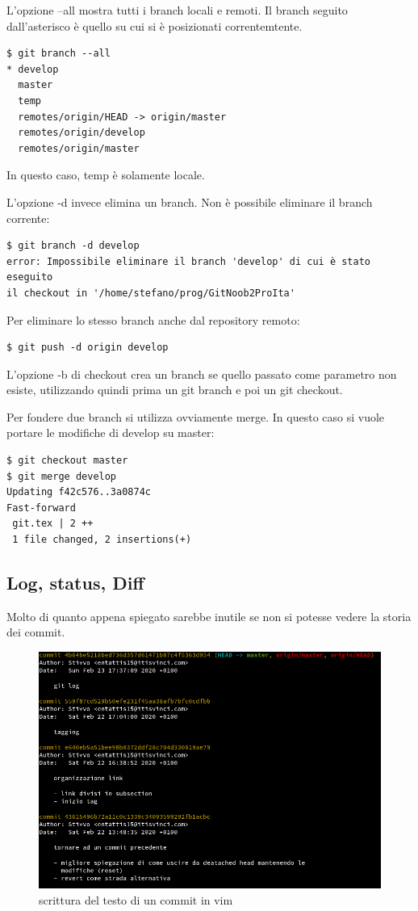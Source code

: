 \documentclass{article} \usepackage[textwidth=18cm,textheight=18cm]{geometry}
\begin{document}
L'opzione --all mostra tutti i branch locali e remoti. Il branch seguito
dall'asterisco è quello su cui si è posizionati correntemtente.

\begin{verbatim}
$ git branch --all
* develop
  master
  temp
  remotes/origin/HEAD -> origin/master
  remotes/origin/develop
  remotes/origin/master
\end{verbatim}

In questo caso, temp è solamente locale.

L'opzione -d invece elimina un branch. Non è possibile eliminare il branch corrente:

\begin{verbatim}
$ git branch -d develop
error: Impossibile eliminare il branch 'develop' di cui è stato eseguito 
il checkout in '/home/stefano/prog/GitNoob2ProIta'
\end{verbatim}

Per eliminare lo stesso branch anche dal repository remoto:

\begin{verbatim}
$ git push -d origin develop
\end{verbatim}

L'opzione -b di checkout crea un branch se quello passato come parametro non
esiste, utilizzando quindi prima un git branch e poi un git checkout.

Per fondere due branch si utilizza ovviamente merge. In questo caso si vuole
portare le modifiche di develop su master:

\begin{verbatim}
$ git checkout master
$ git merge develop
Updating f42c576..3a0874c
Fast-forward
 git.tex | 2 ++
 1 file changed, 2 insertions(+)
\end{verbatim}

\subsection{Log, status, Diff\label{log}}

Molto di quanto appena spiegato sarebbe inutile se non si potesse vedere la
storia dei commit.

\begin{figure}
\includegraphics[width=6in]{logOutput.png}
\centering
\caption{scrittura del testo di un commit in vim}
\end{figure}
\end{document}
